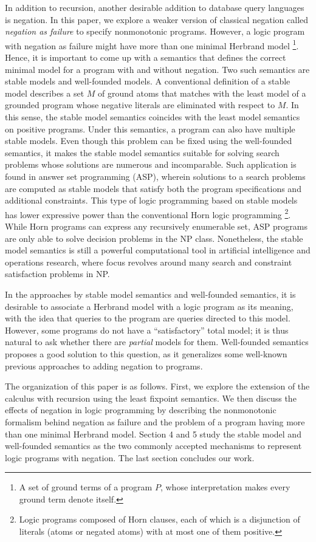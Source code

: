 In addition to recursion, another desirable addition to database query languages 
is negation. In this paper, we explore a weaker version of classical negation called 
\emph{negation as failure} to specify nonmonotonic programs. However, a logic 
program with negation as failure might have more than one minimal Herbrand model 
\footnote{A set of ground terms of a program $P$, whose interpretation 
makes every ground term denote itself.}. Hence, it is important 
to come up with a semantics that defines the correct minimal 
model for a program with and without negation. Two such semantics 
are stable models and well-founded models. A conventional 
definition of a stable model
describes a set $M$ of ground atoms that matches with the least model 
of a grounded program whose negative literals are eliminated with respect to 
$M$. In this sense, the stable model semantics coincides with 
the least model semantics on positive programs. Under this 
semantics, a program can also have multiple stable models. Even though 
this problem can be fixed using the well-founded semantics, 
it makes the stable model semantics suitable for solving search 
problems whose solutions are numerous and incomparable. Such 
application is found in answer set programming (ASP), wherein 
solutions to a search problems are computed as stable models 
that satisfy both the program specifications and additional constraints. 
This type of logic programming based on stable models has lower 
expressive power than the conventional Horn logic programming 
\footnote{Logic programs composed of Horn clauses, 
each of which is a disjunction of literals (atoms or negated atoms) with at most one of 
them positive.}. While Horn programs can express any recursively enumerable set, 
ASP programs are only able to solve decision problems in the NP class. 
Nonetheless, the stable model semantics is still 
a powerful computational tool in artificial 
intelligence and operations research, where focus 
revolves around many search and constraint satisfaction 
problems in NP.

In the approaches by stable model semantics and well-founded semantics, it is desirable to associate a Herbrand model with a logic program as its meaning, with the idea that queries to the program are queries directed to this model. However, some programs do not have a ``satisfactory'' total model; it is thus natural to ask whether there are \emph{partial} models for them. Well-founded semantics proposes a good solution to this question, as it generalizes some well-known previous approaches to adding negation to programs.

The organization of this paper is as follows. First, we 
explore the extension of the calculus with recursion 
using the least fixpoint semantics. We then discuss the effects 
of negation in logic programming by describing the nonmonotonic 
formalism behind negation as failure and the problem of 
a program having more than one minimal Herbrand model. Section 4 and 5 
study the stable model and well-founded semantics as the two 
commonly accepted mechanisms to represent logic programs with 
negation. The last section concludes our work.
